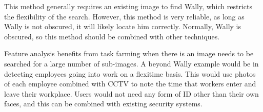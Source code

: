 \documentclass[../main.tex]{subfiles}
\begin{document}
    This method generally requires an existing image to find Wally, which restricts the flexibility of the search.
    However, this method is very reliable, as long as Wally is not obscured, it will likely locate him correctly.
    Normally, Wally is obscured, so this method should be combined with other techniques.

    Feature analysis benefits from task farming when there is an image needs to be searched for a large number of sub-images.
    A beyond Wally example would be in detecting employees going into work on a flexitime basis.
    This would use photos of each employee combined with CCTV to note the time that workers enter and leave their workplace.
    Users would not need any form of ID other than their own faces, and this can be combined with existing security systems.    
    \biblio
\end{document}
